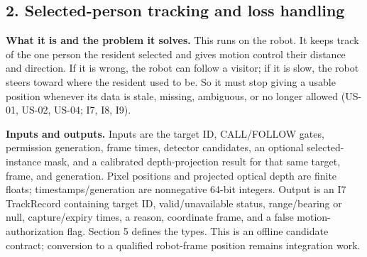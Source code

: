 \documentclass[12pt,letterpaper]{article}
\begin{document}
\subsection*{2. Selected-person tracking and loss handling}

\textbf{What it is and the problem it solves.} This runs on the robot. It keeps track of the one person the resident selected and gives motion control their distance and direction. If it is wrong, the robot can follow a visitor; if it is slow, the robot steers toward where the resident used to be. So it must stop giving a usable position whenever its data is stale, missing, ambiguous, or no longer allowed (US-01, US-02, US-04; I7, I8, I9).

\textbf{Inputs and outputs.} Inputs are the target ID, CALL/FOLLOW gates, permission generation, frame times, detector candidates, an optional selected-instance mask, and a calibrated depth-projection result for that same target, frame, and generation. Pixel positions and projected optical depth are finite floats; timestamps/generation are nonnegative 64-bit integers. Output is an I7 TrackRecord containing target ID, valid/unavailable status, range/bearing or null, capture/expiry times, a reason, coordinate frame, and a false motion-authorization flag. Section 5 defines the types. This is an offline candidate contract; conversion to a qualified robot-frame position remains integration work.
\end{document}
